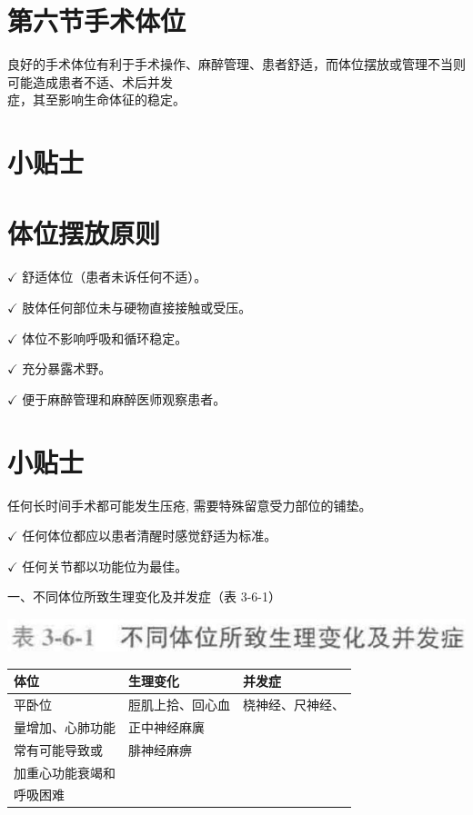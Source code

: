 \documentclass[10pt]{article}
\begin{document}
\section*{第六节手术体位}
良好的手术体位有利于手术操作、麻醉管理、患者舒适，而体位摆放或管理不当则可能造成患者不适、术后并发\\
症，其至影响生命体征的稳定。

\section*{小贴士}
\section*{体位摆放原则}
$\checkmark$ 舒适体位（患者未诉任何不适）。

$\checkmark$ 肢体任何部位未与硬物直接接触或受压。

$\checkmark$ 体位不影响呼吸和循环稳定。

$\checkmark$ 充分暴露术野。

$\checkmark$ 便于麻醉管理和麻醉医师观察患者。

\section*{小贴士}
任何长时间手术都可能发生压疮, 需要特殊留意受力部位的铺垫。

$\checkmark$ 任何体位都应以患者清醒时感觉舒适为标准。

$\checkmark$ 任何关节都以功能位为最佳。

一、不同体位所致生理变化及并发症（表 3-6-1）

\begin{center}
\includegraphics[max width=\textwidth]{2024_07_05_645bb794a4d4f32ee0c8g-110}
\end{center}

\begin{center}
\begin{tabular}{lll}
\hline
体位 & 生理变化 & 并发症 \\
\hline
平卧位 & 脰肌上拾、回心血 & 桡神经、尺神经、 \\
量增加、心肺功能 & 正中神经麻廙 &  \\
常有可能导致或 & 腓神经麻痹 &  \\
加重心功能衰竭和 &  &  \\
呼吸困难 &  &  \\
\end{tabular}
\end{center}
\end{document}
